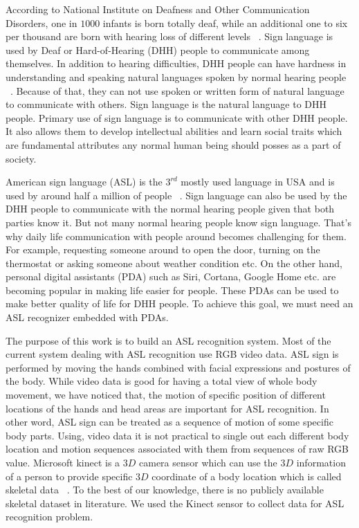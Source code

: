 \documentclass[10pt,twocolumn,letterpaper]{article}
\begin{document}
According to National Institute on Deafness and Other Communication Disorders, one in $1000$ infants is born totally deaf, while an additional one to six per thousand are born with hearing loss of different levels ~\cite{3072291}. Sign language is used by Deaf or Hard-of-Hearing (DHH) people to communicate among themselves. In addition to hearing difficulties, DHH people can have hardness in understanding and speaking natural languages spoken by normal hearing people ~\cite{doi:10.1080/01690965.2012.705006}. Because of that, they can not use spoken or written form of natural language to communicate with others. Sign language is the natural language to DHH people. Primary use of sign language is to communicate with other DHH people. It also allows them to develop intellectual abilities and learn social traits which are fundamental attributes any normal human being should posses as a part of society.

American sign language (ASL) is the $3^{rd}$ mostly used language in USA and is used by around half a million of people ~\cite{sign_lang_study}. Sign language can also be used by the DHH people to communicate with the normal hearing people given that both parties know it. But not many normal hearing people know sign language. That's why daily life communication with people around becomes challenging for them. For example, requesting someone around to open the door, turning on the thermostat or asking someone about weather condition etc. On the other hand, personal digital assistants (PDA) such as Siri, Cortana, Google Home etc. are becoming popular in making life easier for people. These PDAs can be used to make better quality of life for DHH people. To achieve this goal, we must need an ASL recognizer embedded with PDAs.

The purpose of this work is to build an ASL recognition system. Most of the current  system dealing with ASL recognition use RGB video data. ASL sign is performed by moving the hands combined with facial expressions and postures of the body. While video data is good for having a total view of whole body movement, we have noticed that, the motion of specific position of different locations of the hands and head areas are important for ASL recognition. In other word, ASL sign can be treated as a sequence of motion of some specific body parts. Using, video data it is not practical to single out each different body location and motion sequences associated with them from sequences of raw RGB value. Microsoft kinect is a $3D$ camera sensor which can use the $3D$ information of a person to provide specific $3D$ coordinate of a body location which is called skeletal data ~\cite{Zhang:2012:MKS:2225053.2225203}. To the best of our knowledge, there is no publicly available skeletal dataset in literature. We used the Kinect sensor to collect data for ASL recognition problem. 
\end{document}
